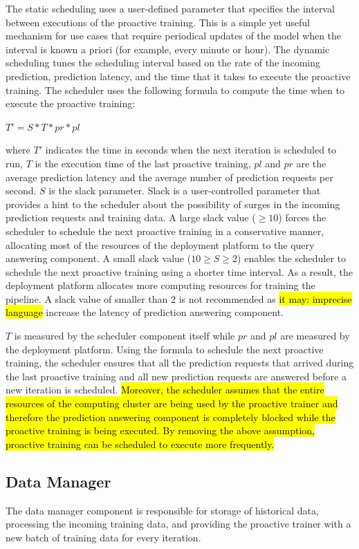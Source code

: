 The static scheduling uses a user-defined parameter that specifies the interval between executions of the proactive training.
This is a simple yet useful mechanism for use cases that require periodical updates of the model when the interval is known a priori (for example, every minute or hour). 
The dynamic scheduling tunes the scheduling interval based on the rate of the incoming prediction, prediction latency, and the time that it takes to execute the proactive training.
The scheduler uses the following formula to compute the time when to execute the proactive training:
\begin{center}
$T' = S * T * pr * pl$
\end{center}
where $T'$ indicates the time in seconds when the next iteration is scheduled to run, $T$ is the execution time of the last proactive training, $pl$ and $pr$ are the average prediction latency and the average number of prediction requests per second.
$S$ is the slack parameter.
Slack is a user-controlled parameter that provides a hint to the scheduler about the possibility of surges in the incoming prediction requests and training data.
A large slack value ($\geq10$) forces the scheduler to schedule the next proactive training in a conservative manner, allocating most of the resources of the deployment platform to the query answering component.
A small slack value ($10 \geq S \geq 2$) enables the scheduler to schedule the next proactive training using a shorter time interval.
As a result, the deployment platform allocates more computing resources for training the pipeline.
A slack value of smaller than 2 is not recommended as \hl{it may: imprecise language} increase the latency of prediction answering component.

$T$ is measured by the scheduler component itself while $pr$ and $pl$ are measured by the deployment platform.
Using the formula to schedule the next proactive training, the scheduler ensures that all the prediction requests that arrived during the last proactive training and all new prediction requests are answered before a new iteration is scheduled.
\hl{Moreover, the scheduler assumes that the entire resources of the computing cluster are being used by the proactive trainer and therefore the prediction answering component is completely blocked while the proactive training is being executed.
By removing the above assumption, proactive training can be scheduled to execute more frequently.}

\subsection{Data Manager} \label{data-manager}
The data manager component is responsible for storage of historical data, processing the incoming training data, and providing the proactive trainer with a new batch of training data for every iteration.

